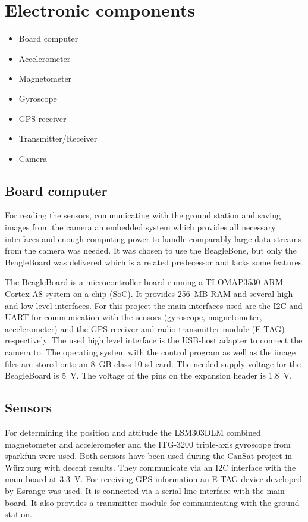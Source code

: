 \section{Electronic components}

\begin{itemize}
 \item Board computer
 \item Accelerometer
 \item Magnetometer
 \item Gyroscope
 \item GPS-receiver
 \item Transmitter/Receiver
 \item Camera
\end{itemize}

\subsection*{Board computer}

For reading the sensors, communicating with the ground station and saving
images from the camera an embedded system which provides all necessary
interfaces and enough computing power to handle comparably large data streams
from the camera was needed. It was chosen to use the BeagleBone, but only the
BeagleBoard was delivered which is a related predecessor and lacks some
features.

The BeagleBoard is a microcontroller board running a TI OMAP3530 ARM Cortex-A8
system on a chip (SoC). It provides 256~MB RAM and several high and low level
interfaces. For this project the main interfaces used are the I2C and UART for
communication with the sensors (gyroscope, magnetometer, accelerometer) and
the GPS-receiver and radio-transmitter module (E-TAG) respectively.
The used high level interface is the USB-host adapter to connect the camera
to. The operating system with the control program as well as the image files
are stored onto an 8~GB class 10 sd-card.
The needed supply voltage for the BeagleBoard is 5~V. The voltage of the pins
on the expansion header is 1.8~V.

\subsection*{Sensors}

For determining the position and attitude the LSM303DLM \cite{LSM303:datasheet}
combined magnetometer and accelerometer and the ITG-3200 triple-axis gyroscope
\cite{ITG-3200:datasheet} from sparkfun were used. Both sensors have been used
during the CanSat-project in Würzburg with decent results. They communicate
via an I2C interface with the main board at 3.3~V. For receiving GPS
information an E-TAG device developed by Esrange was
used. It is connected via a serial line interface with the main board. It also
provides a transmitter module for communicating with the ground station.

